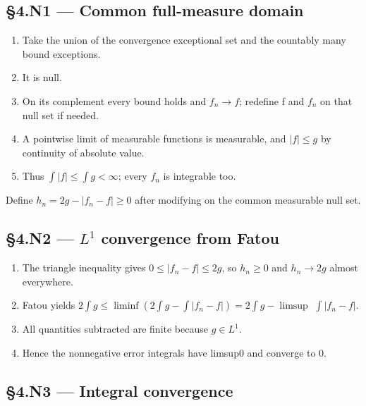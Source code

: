 \documentclass[preprint,12pt,aps,pra,showkeys,amsmath,amssymb,superscriptaddress,floatfix]{revtex4-2}
\theoremstyle{definition}
\theoremstyle{remark}
\begin{document}
\subsection{§4.N1 --- Common full-measure
domain}\label{n1-common-full-measure-domain}

\begin{enumerate}
\def\labelenumi{\arabic{enumi}.}
\item
  Take the union of the convergence exceptional set and the countably
  many bound exceptions.
\item
  It is null.
\item
  On its complement every bound holds and \(f_n\to f\); redefine f and
  \(f_n\) on that null set if needed.
\item
  A pointwise limit of measurable functions is measurable, and
  \(|f|\le g\) by continuity of absolute value.
\item
  Thus \(\int |f|\le \int g<\infty\); every \(f_n\) is integrable too.
\end{enumerate}

Define \(h_n=2g-|f_n-f|\ge0\) after modifying on the common measurable
null set.

\subsection{\texorpdfstring{§4.N2 --- \(L^{1}\) convergence from
Fatou}{§4.N2 --- L\^{}\{1\} convergence from Fatou}}\label{n2-l1-convergence-from-fatou}

\begin{enumerate}
\def\labelenumi{\arabic{enumi}.}
\item
  The triangle inequality gives \(0\le |f_n-f|\le 2g\), so \(h_n\ge 0\)
  and \(h_n\to 2g\) almost everywhere.
\item
  Fatou yields
  \(2\int g\le \operatorname{liminf} (2\int g-\int |f_n-f|)=2\int g-\operatorname{limsup}\)
  \(\int |f_n-f|\).
\item
  All quantities subtracted are finite because \(g\in L^{1}\).
\item
  Hence the nonnegative error integrals have limsup0 and converge to 0.
\end{enumerate}

\subsection{§4.N3 --- Integral
convergence}\label{n3-integral-convergence}
\end{document}
